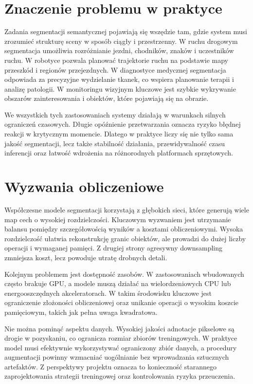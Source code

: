 \documentclass[12pt,oneside,a4paper]{report}
\begin{document}
\section{Znaczenie problemu w praktyce}
Zadania segmentacji semantycznej pojawiają się wszędzie tam, gdzie system musi
zrozumieć strukturę sceny w sposób ciągły i przestrzenny. W ruchu drogowym
segmentacja umożliwia rozróżnianie jezdni, chodników, znaków i uczestników ruchu.
W robotyce pozwala planować trajektorie ruchu na podstawie mapy przeszkód i
regionów przejezdnych. W diagnostyce medycznej segmentacja odpowiada za
precyzyjne wydzielanie tkanek, co wspiera planowanie terapii i analizę
patologii. W monitoringu wizyjnym kluczowe jest szybkie wykrywanie obszarów
zainteresowania i obiektów, które pojawiają się na obrazie.

We wszystkich tych zastosowaniach systemy działają w warunkach silnych
ograniczeń czasowych. Długie opóźnienie przetwarzania oznacza ryzyko błędnej
reakcji w krytycznym momencie. Dlatego w praktyce liczy się nie tylko sama
jakość segmentacji, lecz także stabilność działania, przewidywalność czasu
inferencji oraz łatwość wdrożenia na różnorodnych platformach sprzętowych.

\section{Wyzwania obliczeniowe}
Współczesne modele segmentacji korzystają z głębokich sieci, które generują
wiele map cech o wysokiej rozdzielczości. Kluczowym wyzwaniem jest utrzymanie
balansu pomiędzy szczegółowością wyników a kosztami obliczeniowymi. Wysoka
rozdzielczość ułatwia rekonstrukcję granic obiektów, ale prowadzi do dużej
liczby operacji i wymaganej pamięci. Z drugiej strony agresywny downsampling
zmniejsza koszt, lecz powoduje utratę drobnych detali.

Kolejnym problemem jest dostępność zasobów. W zastosowaniach wbudowanych
często brakuje GPU, a modele muszą działać na wielordzeniowych CPU lub
energooszczędnych akceleratorach. W takim środowisku kluczowe jest ograniczenie
złożoności obliczeniowej oraz unikanie operacji o wysokim koszcie pamięciowym,
takich jak pełna uwaga kwadratowa.

Nie można pominąć aspektu danych. Wysokiej jakości adnotacje pikselowe są
drogie w pozyskaniu, co ogranicza rozmiar zbiorów treningowych. W praktyce
model musi efektywnie wykorzystywać ograniczony zbiór danych, a procedury
augmentacji powinny wzmacniać uogólnianie bez wprowadzania sztucznych artefaktów.
Z perspektywy projektu oznacza to konieczność starannego zaprojektowania
strategii treningowej oraz kontrolowania ryzyka przeuczenia.
\end{document}
